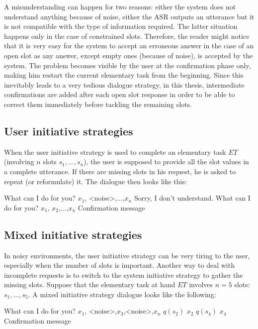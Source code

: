 		A misunderstanding can happen for two reasons: either the system does not understand anything because of noise, either the ASR outputs an utterance but it is not compatible with the type of information required. The latter situation happens only in the case of constrained slots. Therefore, the reader might notice that it is very easy for the system to accept an erroneous answer in the case of an open slot as any answer, except empty ones (because of noise), is accepted by the system. The problem becomes visible by the user at the confirmation phase only, making him restart the current elementary task from the beginning. Since this inevitably leads to a very tedious dialogue strategy, in this thesis, intermediate confirmations are added after each open slot response in order to be able to correct them immediately before tackling the remaining slots.
	
	\subsection{User initiative strategies}
	
		When the user initiative strategy is used to complete an elementary task $ET$ (involving $n$ slots $s_1,...,s_n$), the user is supposed to provide all the slot values in a complete utterance. If there are missing slots in his request, he is asked to repeat (or reformulate) it. The dialogue then looks like this:
		
		\begin{dialogue}
			 What can I do for you?
			 $x_1$, <noise>,...,$x_n$
			 Sorry, I don't understand. What can I do for you?
			 $x_1$, $x_2$,...,$x_n$
			 Confirmation message
		\end{dialogue}
	
	\subsection{Mixed initiative strategies}
	
		In noisy environments, the user initiative strategy can be very tiring to the user, especially when the number of slots is important. Another way to deal with incomplete requests is to switch to the system initiative strategy to gather the missing slots. Suppose that the elementary task at hand $ET$ involves $n=5$ slots: $s_1,...,s_5$. A mixed initiative strategy dialogue looks like the following:
		
		\begin{dialogue}
			 What can I do for you?
			 $x_1$, <noise>,$x_3$,<noise>,$x_n$
			 $q(s_2)$
			\speak{USER} $x_2$
			 $q(s_4)$
			\speak{USER} $x_4$
			 Confirmation message
		\end{dialogue}
	
